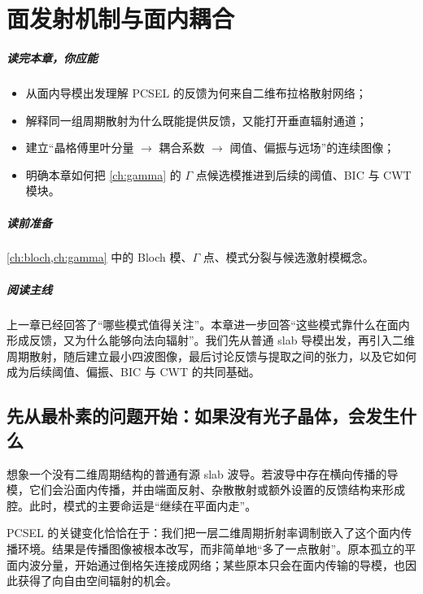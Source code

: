 ﻿%
\chapter{面发射机制与面内耦合}
\label{ch:feedback}

\paragraph{读完本章，你应能}
\begin{itemize}
  \item 从面内导模出发理解 PCSEL 的反馈为何来自二维布拉格散射网络；
  \item 解释同一组周期散射为什么既能提供反馈，又能打开垂直辐射通道；
  \item 建立“晶格傅里叶分量 $\rightarrow$ 耦合系数 $\rightarrow$ 阈值、偏振与远场”的连续图像；
  \item 明确本章如何把 \cref{ch:gamma} 的 $\Gamma$ 点候选模推进到后续的阈值、BIC 与 CWT 模块。
\end{itemize}

\paragraph{读前准备}
\cref{ch:bloch,ch:gamma} 中的 Bloch 模、$\Gamma$ 点、模式分裂与候选激射模概念。

\paragraph{阅读主线}
上一章已经回答了“哪些模式值得关注”。本章进一步回答“这些模式靠什么在面内形成反馈，又为什么能够向法向辐射”。我们先从普通 slab 导模出发，再引入二维周期散射，随后建立最小四波图像，最后讨论反馈与提取之间的张力，以及它如何成为后续阈值、偏振、BIC 与 CWT 的共同基础。

\section{先从最朴素的问题开始：如果没有光子晶体，会发生什么}
想象一个没有二维周期结构的普通有源 slab 波导。若波导中存在横向传播的导模，它们会沿面内传播，并由端面反射、杂散散射或额外设置的反馈结构来形成腔。此时，模式的主要命运是“继续在平面内走”。

PCSEL 的关键变化恰恰在于：我们把一层二维周期折射率调制嵌入了这个面内传播环境。结果是传播图像被根本改写，而非简单地“多了一点散射”。原本孤立的平面内波分量，开始通过倒格矢连接成网络；某些原本只会在面内传输的导模，也因此获得了向自由空间辐射的机会。

